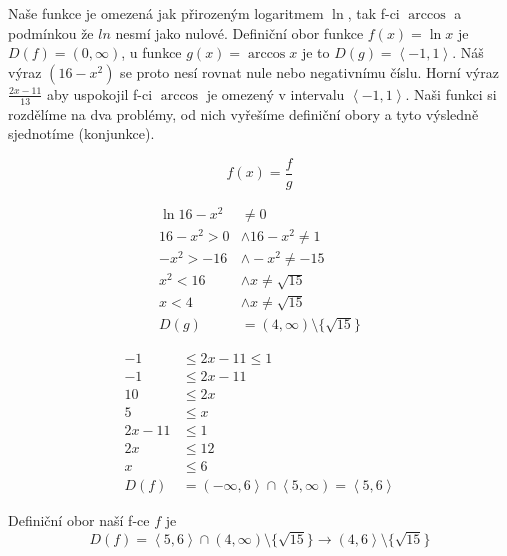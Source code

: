 

Naše funkce je omezená jak přirozeným logaritmem $\ln$, tak f-ci $\arccos$ a podmínkou že $ln$ nesmí jako nulové. Definiční obor funkce $f(x) = \ln{x}$ je $D(f) = (0, \infty)$, u funkce $g(x) = \arccos{x}$ je to $D(g) = \left< -1, 1 \right>$. 
Náš výraz $\left( 16 - x^2 \right)$ se proto nesí rovnat nule nebo negativnímu číslu. Horní výraz $\frac{2x - 11}{13}$ aby uspokojil f-ci $\arccos$ je omezený v intervalu $\left< -1,1 \right>$. Naši funkci si rozdělíme na dva problémy, od nich vyřešíme definiční obory a tyto výsledně sjednotíme (konjunkce). 

$$ f(x) = \frac{f}{g} $$

\begin{align}
	\ln{16 - x^2} &\neq 0 \\
	16 - x^2 > 0 &\wedge 16 - x^2 \neq 1\\
	-x^2 > -16 &\wedge -x^2 \neq -15 \\
	x^2 < 16 &\wedge x \neq \sqrt{15} \\
	x < 4 &\wedge x \neq \sqrt{15} \\
	D(g) &= (4, \infty) \setminus \{ \sqrt{15} \}
\end{align}

\begin{align}
	-1 &\leq 2x - 11 \leq 1 \\
	-1 &\leq 2x - 11 \\
	10 &\leq 2x \\
	5 &\leq x \\
	2x - 11 &\leq 1 \\
	2x &\leq 12 \\
	x &\leq 6 \\
	D(f) &= \left(-\infty, 6\right> \cap \left<5, \infty \right) = \left<5, 6\right>
\end{align}

Definiční obor naší f-ce $f$ je 
$$
D(f) = \left< 5,6 \right> \cap \left( 4,\infty \right) \setminus \{\sqrt{15}\} \rightarrow 
\left( 4, 6 \right> \setminus \{ \sqrt{15} \}
$$

